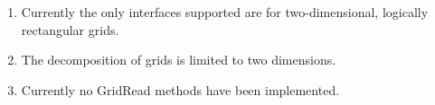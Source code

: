 

\begin{enumerate}

\item Currently the only interfaces supported are for two-dimensional, 
logically rectangular grids. 

\item The decomposition of grids is limited to two dimensions.

\item Currently no GridRead methods have been implemented.

\end{enumerate}


